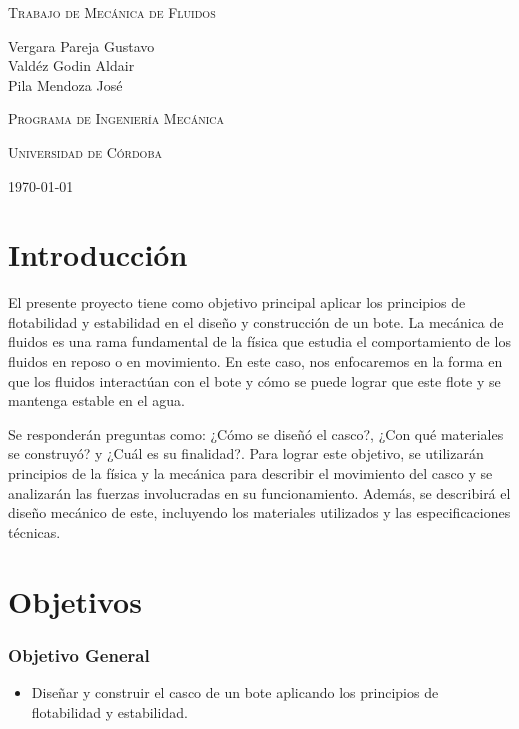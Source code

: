 \documentclass[letterpaper]{article}
\begin{document}
 
\pgfplotsset{compat=1.18}
\begin{titlepage}
	\centering
	\vspace{3cm}
	{\scshape\Huge Trabajo de Mecánica de Fluidos \par}
	\vspace{3cm}
	\textbf\large\scshape{\par}
	\vspace{3cm}
	{\Large Vergara Pareja Gustavo\\Valdéz Godin Aldair\\Pila Mendoza José\par}
	\vspace{4cm}
	{\scshape\Large Programa de Ingeniería Mecánica \par}
	{\scshape\Large Universidad de Córdoba\par}
	{\Large \today \par}
\end{titlepage}
\tableofcontents
\newpage
\section{Introducción}
El presente proyecto tiene como objetivo principal aplicar los principios de flotabilidad y estabilidad 
en el diseño y construcción de un bote. La mecánica de fluidos es una rama fundamental de la física que 
estudia el comportamiento de los fluidos en reposo o en movimiento. En este caso, nos enfocaremos en la 
forma en que los fluidos interactúan con el bote y cómo se puede lograr que este flote y se mantenga 
estable en el agua.
\newline

Se responderán preguntas
como: ¿Cómo se diseñó el casco?, ¿Con qué materiales se construyó? y ¿Cuál es su finalidad?.
\newline
Para lograr este objetivo, se utilizarán principios de la física y la mecánica para describir
el movimiento del casco y se analizarán las fuerzas involucradas en su funcionamiento.
Además, se describirá el diseño mecánico de este, incluyendo los materiales utilizados
y las especificaciones técnicas.
\newpage
\section{Objetivos}
\subsubsection{Objetivo General}
\begin{itemize}
	\item Diseñar y construir el casco de un bote aplicando los principios de flotabilidad y estabilidad.
\end{itemize}
\end{document}
